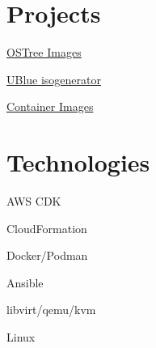 \documentclass[]{friggeri-cv}
\begin{document}
\begin{aside}
  \section{Projects}
    \item[\rightarrow]\href{https://github.com/akdev1l/ostree-images}{OSTree Images}
    \item[\rightarrow]\href{https://github.com/ublue-os/isogenerator}{UBlue isogenerator}
    \item[\rightarrow]\href{https://github.com/akdev1l/container-images}{Container Images}
    ~
  \section{Technologies}
    \item[\rightarrow]{AWS CDK}
    \item[\rightarrow]{CloudFormation}
    \item[\rightarrow]{Docker/Podman}
    \item[\rightarrow]{Ansible}
    \item[\rightarrow]{libvirt/qemu/kvm}
    \item[\rightarrow]{Linux}
    ~
\end{aside}
\end{document}
